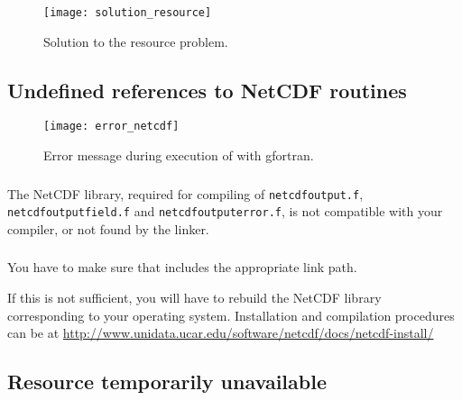 \begin{figure}[htpb]
\centering
\texttt{[image: solution\_resource]}
\caption{Solution to the resource problem.}
\end{figure}


\subsection{Undefined references to NetCDF routines\label{sec:error_netcdf}}

\begin{figure}[htpb]
\centering
\texttt{[image: error\_netcdf]}
\caption{Error message during execution of  with gfortran\label{fig:error_netcdf}.}
\end{figure}

\subsubsection{\question}

The NetCDF library, required for compiling of \texttt{netcdf\-output.f}, \texttt{netcdf\-output\-field.f} and \texttt{netcdf\-output\-error.f}, is not compatible with your compiler, or not found by the linker.

\subsubsection{\answer}

You have to make sure that  includes the appropriate link path.

If this is not sufficient, you will have to rebuild the NetCDF library corresponding to your operating system. Installation and compilation procedures can be at \url{http://www.unidata.ucar.edu/software/netcdf/docs/netcdf-install/}



\subsection[Resource temporarily unavailable]{Resource temporarily unavailable \label{sec:error_resource}}


